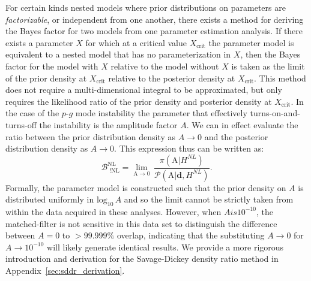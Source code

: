For certain kinds nested models where prior distributions on parameters are \textit{factorizable}, or independent from one another, there exists a method for deriving the Bayes factor for two models from one parameter estimation analysis. If there exists a parameter $X$ for which at a critical value $X_\mathrm{crit}$ the parameter model is equivalent to a nested model that has no parameterization in $X$, then the Bayes factor for the model with $X$ relative to the model without $X$ is taken as the limit of the prior density at $X_\mathrm{crit}$ relative to the posterior density at $X_\mathrm{crit}$. This method does not require a multi-dimensional integral to be approximated, but only requires the likelihood ratio of the prior density and posterior density at $X_\mathrm{crit}$.  In the case of the $p$-$g$ mode instability the parameter that effectively turns-on-and-turns-off the instability is the amplitude factor $A$. We can in effect evaluate the ratio between the prior distribution density as $A \to 0$ and the posterior distribution density as $A \to 0$. This expression thus can be written as:
\begin{equation}\label{eq:sddr_bayes_factor}
    \mathcal{B}^{\mathrm{NL} \, \,}_{\, \, !\mathrm{NL}} = \lim_{\mathrm{A} \to 0} \, \frac{\pi\left(\mathrm{A} | H^{NL}\right)}{\mathcal{P}\left(\mathrm{A} | \mathbf{d}, H^{NL}\right)}.
\end{equation}
Formally, the parameter model is constructed such that the prior density on $A$ is distributed uniformly in $\mathrm{log}_{10} \, A$ and so the limit cannot be strictly taken from within the data acquired in these analyses. However, when $A is 10^{-10}$, the matched-filter is not sensitive in this data set to distinguish the difference between $A=0$ to $> 99.999\%$ overlap, indicating that the substituting $A \to 0$ for $A \to 10^{-10}$ will likely generate identical results. We provide a more rigorous introduction and derivation for the Savage-Dickey density ratio method in Appendix~\ref{sec:sddr_derivation}.

